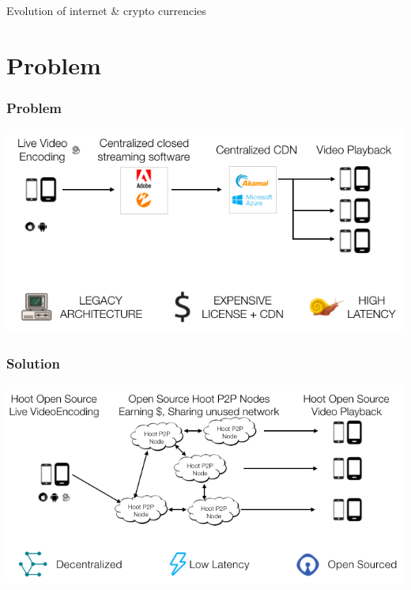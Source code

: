 \documentclass[10pt]{beamer}
\begin{document}
\begin{frame}[t]{Evolution of internet \& crypto currencies}
 
\end{frame} 
\section{Problem}
\begin{frame}[t]\frametitle{Problem}

   \includegraphics[width=1.0\textwidth]{static/problem-architecture-trans}

\end{frame}
\begin{frame}[t]\frametitle{Solution}
   \includegraphics[width=1.0\textwidth]{static/hoot-solution-trans}

\end{frame}
\end{document}
